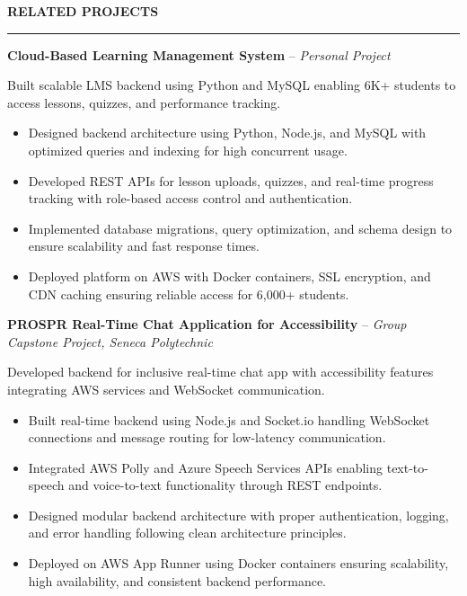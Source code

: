 \documentclass[10pt,letterpaper]{article}
\begin{document}
\vspace{6pt}

\textbf{RELATED PROJECTS}\\[-8pt]
\noindent\rule{\textwidth}{1pt}

\vspace{-2pt}

\textbf{Cloud-Based Learning Management System} -- \emph{Personal Project}

\vspace{-1pt}

Built scalable LMS backend using Python and MySQL enabling 6K+ students to access lessons, quizzes, and performance tracking.
\vspace{-1pt}
\begin{itemize}
\item Designed backend architecture using Python, Node.js, and MySQL with optimized queries and indexing for high concurrent usage.
\item Developed REST APIs for lesson uploads, quizzes, and real-time progress tracking with role-based access control and authentication.
\item Implemented database migrations, query optimization, and schema design to ensure scalability and fast response times.
\item Deployed platform on AWS with Docker containers, SSL encryption, and CDN caching ensuring reliable access for 6,000+ students.
\end{itemize}

\textbf{PROSPR  Real-Time Chat Application for Accessibility} -- \emph{Group Capstone Project, Seneca Polytechnic}

\vspace{-1pt}

Developed backend for inclusive real-time chat app with accessibility features integrating AWS services and WebSocket communication.
\vspace{-1pt}
\begin{itemize}
\item Built real-time backend using Node.js and Socket.io handling WebSocket connections and message routing for low-latency communication.
\item Integrated AWS Polly and Azure Speech Services APIs enabling text-to-speech and voice-to-text functionality through REST endpoints.
\item Designed modular backend architecture with proper authentication, logging, and error handling following clean architecture principles.
\item Deployed on AWS App Runner using Docker containers ensuring scalability, high availability, and consistent backend performance.
\end{itemize}
\end{document}
